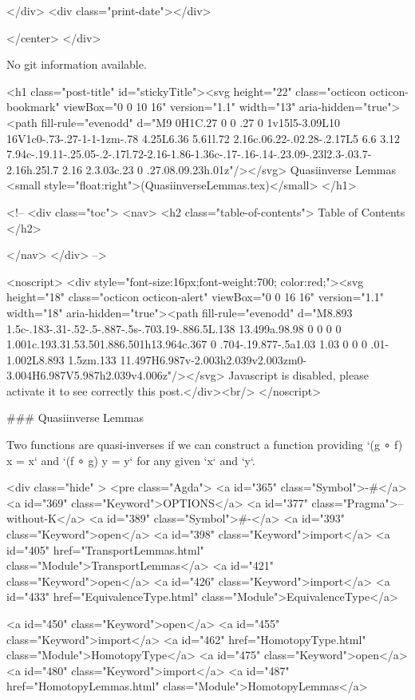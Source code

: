           
        </div>
        <div class="print-date"></div>
        
        
    </center>
  </div>

  
  No git information available.
  

  <h1 class="post-title" id="stickyTitle"><svg height="22" class="octicon octicon-bookmark" viewBox="0 0 10 16" version="1.1" width="13" aria-hidden="true"><path fill-rule="evenodd" d="M9 0H1C.27 0 0 .27 0 1v15l5-3.09L10 16V1c0-.73-.27-1-1-1zm-.78 4.25L6.36 5.61l.72 2.16c.06.22-.02.28-.2.17L5 6.6 3.12 7.94c-.19.11-.25.05-.2-.17l.72-2.16-1.86-1.36c-.17-.16-.14-.23.09-.23l2.3-.03.7-2.16h.25l.7 2.16 2.3.03c.23 0 .27.08.09.23h.01z"/></svg> Quasiinverse Lemmas <small style="float:right">(QuasiinverseLemmas.tex)</small>
  </h1>

  <!-- 
  <div class="toc">
    <nav>
    <h2 class="table-of-contents"> Table of Contents </h2>
      

    </nav>
  </div>
   -->

  <noscript>
  <div style="font-size:16px;font-weight:700; color:red;"><svg height="18" class="octicon octicon-alert" viewBox="0 0 16 16" version="1.1" width="18" aria-hidden="true"><path fill-rule="evenodd" d="M8.893 1.5c-.183-.31-.52-.5-.887-.5s-.703.19-.886.5L.138 13.499a.98.98 0 0 0 0 1.001c.193.31.53.501.886.501h13.964c.367 0 .704-.19.877-.5a1.03 1.03 0 0 0 .01-1.002L8.893 1.5zm.133 11.497H6.987v-2.003h2.039v2.003zm0-3.004H6.987V5.987h2.039v4.006z"/></svg> Javascript is disabled, please activate it to see correctly this post.</div><br/>
  </noscript>

  ### Quasiinverse Lemmas

Two functions are quasi-inverses if we can construct a function providing
`(g ∘ f) x = x` and `(f ∘ g) y = y` for any given `x` and `y`.

<div class="hide" >
<pre class="Agda">
<a id="365" class="Symbol">{-#</a> <a id="369" class="Keyword">OPTIONS</a> <a id="377" class="Pragma">--without-K</a> <a id="389" class="Symbol">#-}</a>
<a id="393" class="Keyword">open</a> <a id="398" class="Keyword">import</a> <a id="405" href="TransportLemmas.html" class="Module">TransportLemmas</a>
<a id="421" class="Keyword">open</a> <a id="426" class="Keyword">import</a> <a id="433" href="EquivalenceType.html" class="Module">EquivalenceType</a>

<a id="450" class="Keyword">open</a> <a id="455" class="Keyword">import</a> <a id="462" href="HomotopyType.html" class="Module">HomotopyType</a>
<a id="475" class="Keyword">open</a> <a id="480" class="Keyword">import</a> <a id="487" href="HomotopyLemmas.html" class="Module">HomotopyLemmas</a>


